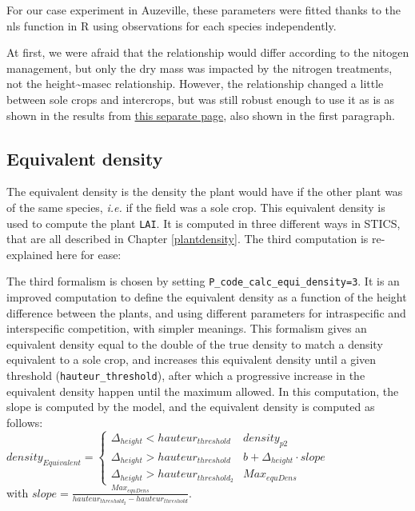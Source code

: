 \documentclass[]{book}
\begin{document}
For our case experiment in Auzeville, these parameters were fitted thanks to the nls function in R using observations for each species independently.

At first, we were afraid that the relationship would differ according to the nitogen management, but only the dry mass was impacted by the nitrogen treatments, not the height\textasciitilde{}masec relationship. However, the relationship changed a little between sole crops and intercrops, but was still robust enough to use it as is as shown in the results from \href{Auzeville_summary.html}{this separate page}, also shown in the first paragraph.

\hypertarget{equivalent-density}{%
\subsection{Equivalent density}\label{equivalent-density}}

The equivalent density is the density the plant would have if the other plant was of the same species, \emph{i.e.} if the field was a sole crop. This equivalent density is used to compute the plant \texttt{LAI}. It is computed in three different ways in STICS, that are all described in Chapter \ref{plantdensity}. The third computation is re-explained here for ease:

The third formalism is chosen by setting \texttt{P\_code\_calc\_equi\_density=3}. It is an improved computation to define the equivalent density as a function of the height difference between the plants, and using different parameters for intraspecific and interspecific competition, with simpler meanings. This formalism gives an equivalent density equal to the double of the true density to match a density equivalent to a sole crop, and increases this equivalent density until a given threshold (\texttt{hauteur\_threshold}), after which a progressive increase in the equivalent density happen until the maximum allowed. In this computation, the slope is computed by the model, and the equivalent density is computed as follows:\\
\(density_{Equivalent} =\begin{cases}\Delta_{height} < hauteur_{threshold} & density_{p2} \\ \Delta_{height} > hauteur_{threshold} & b + \Delta_{height}\cdot slope \\ \Delta_{height} > hauteur_{threshold_2} & Max_{equDens} \end{cases}\)\\
with \(slope= \frac{Max_{equDens}}{hauteur_{threshold_2}-hauteur_{threshold}}\).
\end{document}
